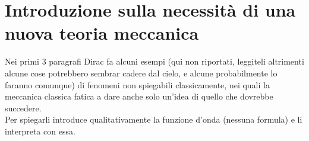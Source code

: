 \documentclass[../../Meccanica_quantistica]{subfiles}
\begin{document}
\section{Introduzione sulla necessità di una nuova teoria meccanica}
Nei primi 3 paragrafi Dirac fa alcuni esempi (qui non riportati,
leggiteli altrimenti alcune cose potrebbero sembrar cadere dal
cielo, e alcune probabilmente lo faranno comunque) di fenomeni non
spiegabili classicamente, nei quali la meccanica classica fatica a
dare anche solo un'idea di quello che dovrebbe succedere. \\
Per spiegarli introduce qualitativamente la funzione d'onda (nessuna
formula) e li interpreta con essa.
\end{document}
